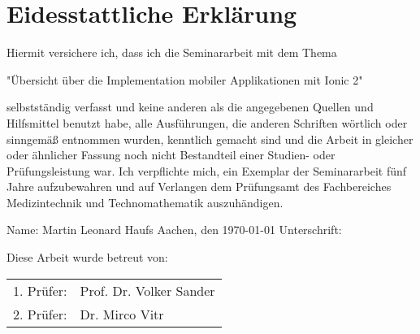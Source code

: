 \chapter*{Eidesstattliche Erklärung}
Hiermit versichere ich, dass ich die Seminararbeit mit dem Thema 
\begin{center}
    "Übersicht über die Implementation mobiler Applikationen mit Ionic 2"
\end{center}
selbstständig verfasst und keine anderen als die angegebenen Quellen und Hilfsmittel benutzt habe, alle Ausführungen, die anderen Schriften wörtlich oder sinngemäß entnommen wurden, kenntlich gemacht sind und die Arbeit in gleicher oder ähnlicher Fassung noch nicht Bestandteil einer Studien- oder Prüfungsleistung war. Ich verpflichte mich, ein Exemplar der Seminararbeit fünf Jahre aufzubewahren und auf Verlangen dem Prüfungsamt des Fachbereiches Medizintechnik und Technomathematik auszuhändigen. 
\linebreak
\linebreak
\begin{flushleft}
    Name: Martin Leonard Haufs
    \linebreak 
    Aachen, den \today
    \linebreak	
    \linebreak
    Unterschrift: \underline{\hspace{5cm}}
    	
    \vspace{2.0cm}
    Diese Arbeit wurde betreut von: \linebreak
    
    \begin{tabular*}{\linewidth}{ll}
    	1. Prüfer: & Prof. Dr. Volker Sander\\
    	2. Prüfer: & Dr. Mirco Vitr
    \end{tabular*}

\end{flushleft}
